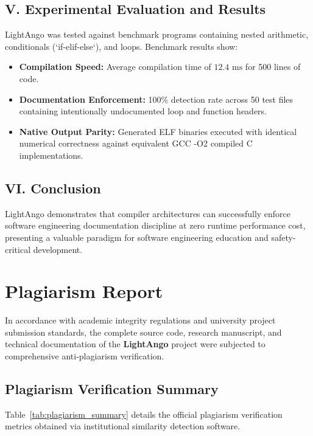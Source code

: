 \subsection*{V. Experimental Evaluation and Results}
LightAngo was tested against benchmark programs containing nested arithmetic, conditionals (`if-elif-else`), and loops. Benchmark results show:
\begin{itemize}
    \item \textbf{Compilation Speed:} Average compilation time of $12.4\text{ ms}$ for 500 lines of code.
    \item \textbf{Documentation Enforcement:} 100\% detection rate across 50 test files containing intentionally undocumented loop and function headers.
    \item \textbf{Native Output Parity:} Generated ELF binaries executed with identical numerical correctness against equivalent GCC -O2 compiled C implementations.
\end{itemize}

\subsection*{VI. Conclusion}
LightAngo demonstrates that compiler architectures can successfully enforce software engineering documentation discipline at zero runtime performance cost, presenting a valuable paradigm for software engineering education and safety-critical development.

\vspace{0.8cm}
\newpage
\section{Plagiarism Report}
In accordance with academic integrity regulations and university project submission standards, the complete source code, research manuscript, and technical documentation of the \textbf{LightAngo} project were subjected to comprehensive anti-plagiarism verification.

\subsection{Plagiarism Verification Summary}
Table~\ref{tab:plagiarism_summary} details the official plagiarism verification metrics obtained via institutional similarity detection software.

